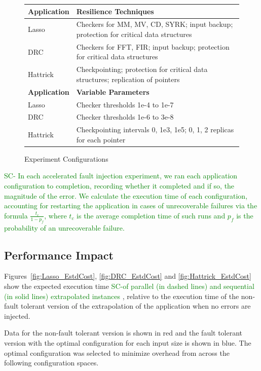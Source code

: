 \documentclass{sig-alternate}
\newcommand{\sui}[1]{%
  \textcolor{green}{SC-#1}
}
\begin{document}
{\begin{figure}[ht!]
\centering
\begin{tabular}{|p{0.7in}|p{2.0in}|}
\hline
{\bf Application} & {\bf Resilience Techniques} \\
\hline
\hline
Lasso & Checkers for MM, MV, CD, SYRK; input backup; protection for critical data structures \\
\hline
DRC & Checkers for FFT, FIR; input backup; protection for critical data structures \\
\hline
Hattrick & Checkpointing; protection for critical data structures; replication of pointers \\
\hline
\hline
{\bf Application} & {\bf Variable Parameters} \\
\hline
\hline
Lasso & Checker thresholds 1e-4 to 1e-7 \\
\hline
DRC   & Checker thresholds 1e-6 to 3e-8 \\
\hline
Hattrick & Checkpointing intervals 0, 1e3, 1e5; 0, 1, 2 replicas for each pointer \\
\hline
\end{tabular}
\caption{Experiment Configurations}
\label{fig:exp_confs}
\end{figure}

\sui{
	In each accelerated fault injection experiment, we ran each application configuration to completion, recording whether it completed and if so, the magnitude of the
	error.
	We calculate the execution time of each configuration, accounting for restarting the application in cases of unrecoverable failures via the formula $\frac{t_c}{1-p_f}$, where $t_c$ is the average completion time of such runs and $p_f$ is the probability of an unrecoverable failure.
}

\subsection{Performance Impact}
\label{sec:eval:perf}
Figures~\ref{fig:Lasso_EstdCost}, \ref{fig:DRC_EstdCost} and \ref{fig:Hattrick_EstdCost} show the expected execution time \sui{of parallel (in dashed lines) and sequential (in solid lines) extrapolated instances}, relative to the execution time of the non-fault tolerant version of the extrapolation of the application when no errors are injected.

Data for the non-fault tolerant version is shown in red and the fault tolerant version with the optimal configuration for each input size is shown in blue.
The optimal configuration was selected to minimize overhead from across the following configuration spaces.

}
\end{document}
